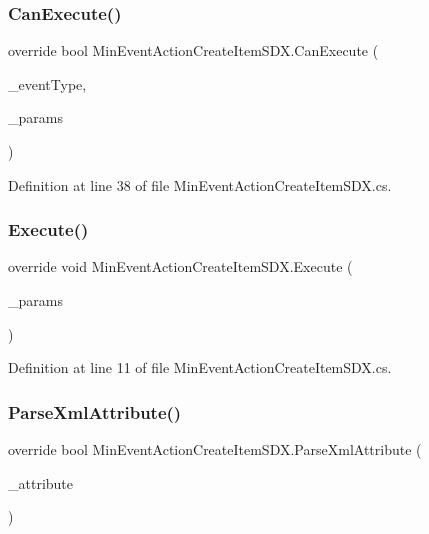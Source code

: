 \subsubsection{\texorpdfstring{CanExecute()}{CanExecute()}}
{\footnotesize\ttfamily override bool Min\+Event\+Action\+Create\+Item\+S\+D\+X.\+Can\+Execute (\begin{DoxyParamCaption}\item[{Min\+Event\+Types}]{\+\_\+event\+Type,  }\item[{Min\+Event\+Params}]{\+\_\+params }\end{DoxyParamCaption})}



Definition at line 38 of file Min\+Event\+Action\+Create\+Item\+S\+D\+X.\+cs.

\mbox{\label{class_min_event_action_create_item_s_d_x_a988881e3f8cfc8d0ee0b596449f13c1f}} 
\subsubsection{\texorpdfstring{Execute()}{Execute()}}
{\footnotesize\ttfamily override void Min\+Event\+Action\+Create\+Item\+S\+D\+X.\+Execute (\begin{DoxyParamCaption}\item[{Min\+Event\+Params}]{\+\_\+params }\end{DoxyParamCaption})}



Definition at line 11 of file Min\+Event\+Action\+Create\+Item\+S\+D\+X.\+cs.

\mbox{\label{class_min_event_action_create_item_s_d_x_af877e2c903654e429c2900b709c5af65}} 
\subsubsection{\texorpdfstring{ParseXmlAttribute()}{ParseXmlAttribute()}}
{\footnotesize\ttfamily override bool Min\+Event\+Action\+Create\+Item\+S\+D\+X.\+Parse\+Xml\+Attribute (\begin{DoxyParamCaption}\item[{Xml\+Attribute}]{\+\_\+attribute }\end{DoxyParamCaption})}



